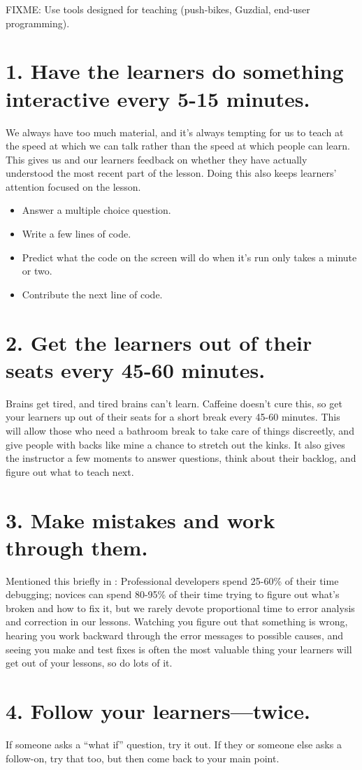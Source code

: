 \documentclass[10pt,letterpaper]{article}
\newcommand{\rulemajor}[1]{\section{#1}}
\begin{document}
\item FIXME: Use tools designed for teaching (push-bikes, Guzdial, end-user programming).

\rulemajor{1. Have the learners do something interactive every 5-15 minutes.}

We always have too much material,
and it's always tempting for us to teach at the speed at which we can talk
rather than the speed at which people can learn.
This gives us and our learners feedback on whether they have actually understood the most recent part of the lesson.
Doing this also keeps learners' attention focused on the lesson.

\begin{itemize}
\item Answer a multiple choice question.
\item Write a few lines of code.
\item Predict what the code on the screen will do when it's run only takes a minute or two.
\item Contribute the next line of code.
\end{itemize}

\rulemajor{2. Get the learners out of their seats every 45-60 minutes.}

Brains get tired, and tired brains can't learn.
Caffeine doesn't cure this,
so get your learners up out of their seats for a short break every 45-60 minutes.
This will allow those who need a bathroom break to take care of things discreetly,
and give people with backs like mine a chance to stretch out the kinks.
It also gives the instructor a few moments to answer questions,
think about their backlog,
and figure out what to teach next.

\rulemajor{3. Make mistakes and work through them.}

Mentioned this briefly in \cite{Brow2018}:
Professional developers spend 25-60\% of their time debugging;
novices can spend 80-95\% of their time trying to figure out what's broken and how to fix it,
but we rarely devote proportional time to error analysis and correction in our lessons.
Watching you figure out that something is wrong,
hearing you work backward through the error messages to possible causes,
and seeing you make and test fixes is often the most valuable thing your learners will get out of your lessons,
so do lots of it.

\rulemajor{4. Follow your learners---twice.}

If someone asks a ``what if'' question, try it out.
If they or someone else asks a follow-on, try that too, but then come back to your main point.
\end{document}
